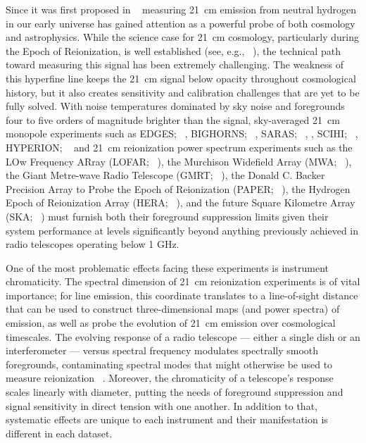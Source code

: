 \documentclass[twocolumn]{emulateapj}
\begin{document}
Since it was first proposed in ~\citep{Shaver_et_al1999} measuring 21~cm
emission from neutral hydrogen in our early universe has gained attention as a
powerful probe of both cosmology and astrophysics.  While the science case for
21~cm cosmology, particularly during the Epoch of Reionization, is well
established (see, e.g.,
~\cite{furlanetto_et_al2006, morales_wyithe2010, pritchard_loeb2012}),
the technical path toward measuring this signal has been extremely challenging.  The
weakness of this hyperfine line keeps the 21~cm signal below opacity throughout
cosmological history, but it also creates sensitivity and calibration
challenges that are yet to be fully solved.  With noise temperatures dominated
by sky noise and foregrounds four to five orders of magnitude
brighter than the signal, 
sky-averaged 21~cm monopole experiments such as
EDGES; ~\citep{Bowman_et_al2010},
BIGHORNS; ~\citealt{2015PhDT........65V},
SARAS; ~\citep{Patra_et_al2015}, \citep{Patra_et_al2013} ,
SCIHI; ~\citep{2015PhDT........65V},
HYPERION; ~\citep{presley_et_al2015}
and 21~cm reionization power spectrum experiments such as
the LOw Frequency ARray (LOFAR; ~\citealt{van_Haarlem_2013}),
the Murchison Widefield Array (MWA; ~\citealt{Tingay_2013}),
the Giant Metre-wave Radio Telescope (GMRT; ~\citealt{Paciga_et_al2011}),
the Donald C. Backer Precision Array to Probe the Epoch of Reionization (PAPER; ~\citealt{parsons_et_al2010}),
the Hydrogen Epoch of Reionization Array (HERA; ~\citealt{deBoer_2016}),
and the future Square Kilometre Array (SKA; ~\citealt{XXX})
must furnish both their foreground suppression limits given their system performance at levels significantly
beyond anything previously achieved in radio telescopes operating below 1 GHz.

One of the most problematic effects facing these experiments is instrument
chromaticity.  The spectral dimension of 21~cm reionization experiments is of vital
importance; for line emission, this coordinate translates to a line-of-sight distance
that can be used to construct three-dimensional maps (and power spectra) of emission,
as well as probe the evolution of 21~cm emission over cosmological timescales.
The evolving response of a radio telescope --- either a single dish
or an interferometer --- versus spectral frequency modulates spectrally smooth foregrounds,
contaminating spectral modes that might
otherwise be used to measure reionization ~\citep{liu_et_al2014a}.  Moreover, the chromaticity of
a telescope's response scales linearly with diameter, putting the
needs of foreground suppression and signal sensitivity in direct tension with one
another. In addition to that, systematic effects are unique to each instrument and their manifestation 
is different in each dataset.
\end{document}
